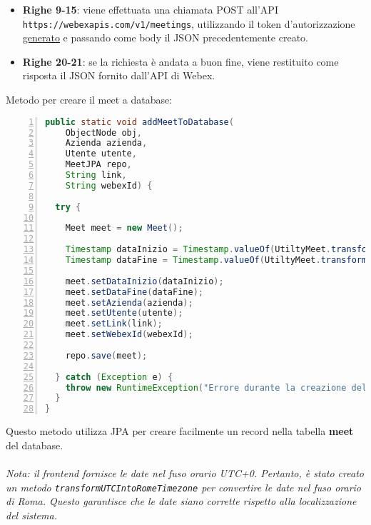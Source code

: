 \begin{itemize}
    \item \textbf{Righe 9-15}: viene effettuata una chiamata POST all'API 
    \\ \texttt{https://webexapis.com/v1/meetings}, utilizzando il token d'autorizzazione \hyperref[sec:recupero_access_token]{generato} 
    e passando come body il JSON precedentemente creato.

    \item \textbf{Righe 20-21}: se la richiesta è andata a buon fine, viene restituito come risposta il JSON fornito dall'API di Webex.
    
\end{itemize}
Metodo per creare il meet a database:
\begin{lstlisting}[language=java, frame=lines, basicstyle=\ttfamily\scriptsize, numbers=left]
public static void addMeetToDatabase(
    ObjectNode obj, 
    Azienda azienda, 
    Utente utente, 
    MeetJPA repo, 
    String link,
    String webexId) {

  try {
    
    Meet meet = new Meet();
  
    Timestamp dataInizio = Timestamp.valueOf(UtiltyMeet.transformUTCIntoRomeTimezone(obj.get("data_inizio").asText()));
    Timestamp dataFine = Timestamp.valueOf(UtiltyMeet.transformUTCIntoRomeTimezone(obj.get("data_fine").asText()));

    meet.setDataInizio(dataInizio);
    meet.setDataFine(dataFine);
    meet.setAzienda(azienda);
    meet.setUtente(utente);
    meet.setLink(link);
    meet.setWebexId(webexId);

    repo.save(meet);

  } catch (Exception e) {
    throw new RuntimeException("Errore durante la creazione del meeting al database", e);
  }
}
\end{lstlisting}
Questo metodo utilizza JPA per creare facilmente un record nella tabella \textbf{meet} del database.
\\
\\
\textit{Nota: il frontend fornisce le date nel fuso orario UTC+0. Pertanto, è stato creato 
un metodo \texttt{transformUTCIntoRomeTimezone} per convertire le date nel fuso orario di Roma. 
Questo garantisce che le date siano corrette rispetto alla localizzazione del sistema.}